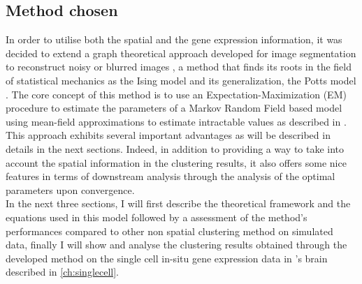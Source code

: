 	\subsection{Method chosen}
In order to utilise both the spatial and the gene expression information, it was decided to extend a graph theoretical approach developed for image segmentation to reconstruct noisy or blurred images \cite{Dang98}, a method that finds its roots in the field of statistical mechanics as the Ising model \cite{Ising25} and its generalization, the Potts model \cite{Wu82}. The core concept of this method is to use an Expectation-Maximization (EM) procedure to estimate the parameters of a Markov Random Field based model using mean-field approximations to estimate intractable values as described in \cite{Celeux01}.\\

This approach exhibits several important advantages as will be described in details in the next sections. Indeed, in addition to providing a way to take into account the spatial information in the clustering results, it also offers some nice features in terms of downstream analysis through the analysis of the optimal parameters upon convergence.\\

In the next three sections, I will first describe the theoretical framework and the equations used in this model followed by a assessment of the method's performances compared to other non spatial clustering method on simulated data, finally I will show and analyse the clustering results obtained through the developed method on the single cell in-situ gene expression data in \platy{}'s brain described in \ref{ch:singlecell}.




